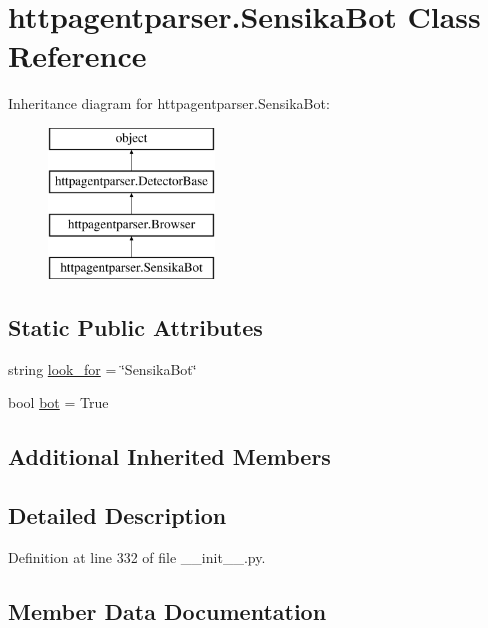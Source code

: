 \hypertarget{classhttpagentparser_1_1_sensika_bot}{}\section{httpagentparser.\+Sensika\+Bot Class Reference}
\label{classhttpagentparser_1_1_sensika_bot}
Inheritance diagram for httpagentparser.\+Sensika\+Bot\+:\begin{figure}[H]
\begin{center}
\leavevmode
\includegraphics[height=4.000000cm]{classhttpagentparser_1_1_sensika_bot}
\end{center}
\end{figure}
\subsection*{Static Public Attributes}
\begin{DoxyCompactItemize}
\item 
string \hyperlink{classhttpagentparser_1_1_sensika_bot_a1837d7bf009d223ccfe0ee64a288dca2}{look\+\_\+for} = \char`\"{}Sensika\+Bot\char`\"{}
\item 
bool \hyperlink{classhttpagentparser_1_1_sensika_bot_a48c18daf53544923663440fc15bb9420}{bot} = True
\end{DoxyCompactItemize}
\subsection*{Additional Inherited Members}


\subsection{Detailed Description}


Definition at line 332 of file \+\_\+\+\_\+init\+\_\+\+\_\+.\+py.



\subsection{Member Data Documentation}
\hypertarget{classhttpagentparser_1_1_sensika_bot_a48c18daf53544923663440fc15bb9420}{}\label{classhttpagentparser_1_1_sensika_bot_a48c18daf53544923663440fc15bb9420} 
